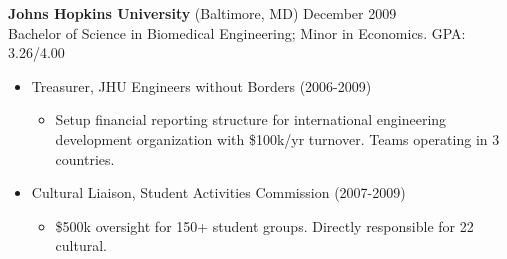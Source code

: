 \documentclass[margin]{res}
\newcommand{\locdatesubsection}[3]{\textbf{#1} (#2) \hfill #3}
\begin{document}
\begin{sloppypar}
\begin{resume}




\locdatesubsection{Johns Hopkins University}{Baltimore, MD}{December 2009}\\
Bachelor of Science in Biomedical Engineering; Minor in Economics. GPA: 3.26/4.00
\begin{itemize}
\item Treasurer, JHU Engineers without Borders (2006-2009)
    \begin{itemize}
        \item Setup financial reporting structure for international engineering development organization with \$100k/yr turnover. Teams operating in 3 countries.
    \end{itemize}
\item Cultural Liaison, Student Activities Commission (2007-2009)
    \begin{itemize}
    \item \$500k oversight for 150+ student groups. Directly responsible for 22 cultural.
    \end{itemize}
\end{itemize}


\end{resume}
\end{sloppypar}
\end{document}
